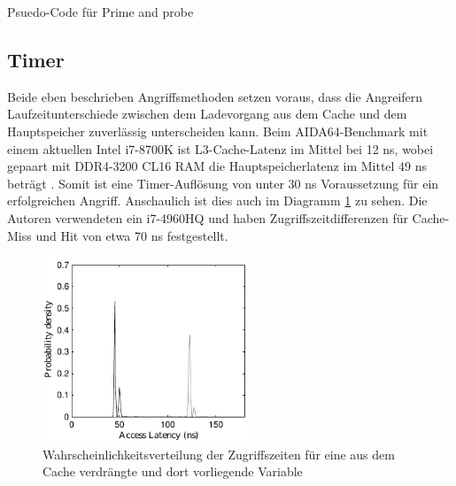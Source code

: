 \begin{algorithm}[h]
\DontPrintSemicolon
\caption{Psuedo-Code für Prime and probe}
\label{alg:prime_and_pribe}


\end{algorithm}



\subsection{Timer}

Beide eben beschrieben Angriffsmethoden setzen voraus, dass die Angreifern Laufzeitunterschiede zwischen dem Ladevorgang aus dem Cache und dem Hauptspeicher zuverlässig unterscheiden kann. Beim AIDA64-Benchmark mit einem aktuellen Intel i7-8700K ist L3-Cache-Latenz im Mittel bei 12 ns, wobei gepaart mit DDR4-3200 CL16 RAM die Hauptspeicherlatenz im Mittel 49 ns beträgt \cite{i78700kLatency}. Somit ist eine Timer-Auflösung von unter 30 ns Voraussetzung für ein erfolgreichen Angriff. Anschaulich ist dies auch im Diagramm \ref{fig:RAMCacheLatency} zu sehen. Die Autoren verwendeten ein i7-4960HQ und haben Zugriffszeitdifferenzen für Cache-Miss und Hit von etwa 70 ns festgestellt. 

\begin{figure}[h]
\label{fig:RAMCacheLatency}
\caption{Wahrscheinlichkeitsverteilung der Zugriffszeiten für eine aus dem Cache verdrängte und dort vorliegende Variable \cite{TheSpyInTheSandbox}}
\centering
\includegraphics[width=0.55\textwidth]{basics/i7-4790HQ_latency_plot.pdf}
\end{figure}




